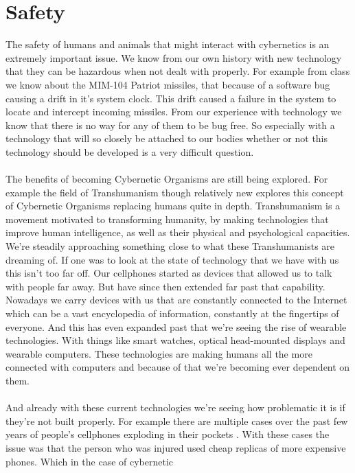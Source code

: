 \documentclass[12pt,a4paper,notitlepage]{article}
\begin{document}
\section{Safety}
The safety of humans and animals that might interact with cybernetics is an
extremely important issue. We know from our own history with new technology that
they can be hazardous when not dealt with properly. For example from class we
know about the MIM-104 Patriot missiles, that because of a software bug causing
a drift in it's system clock. This drift caused a failure in the system to
locate and intercept incoming missiles. From our experience with technology we
know that there is no way for any of them to be bug free. So especially with a
technology that will so closely be attached to our bodies whether or not this
technology should be developed is a very difficult question.
\\\\
The benefits of becoming Cybernetic Organisms are still being explored. For
example the field of Transhumanism\cite{Transhumanism} though relatively new
explores this concept of Cybernetic Organisms replacing humans quite in depth.
Transhumanism is a movement motivated to transforming humanity, by making
technologies that improve human intelligence, as well as their physical and
psychological capacities. We're steadily approaching something close to what
these Transhumanists are dreaming of. If one was to look at the state of
technology that we have with us this isn't too far off. Our cellphones started
as devices that allowed us to talk with people far away.  But have since then
extended far past that capability. Nowadays we carry devices with us that are
constantly connected to the Internet which can be a vast encyclopedia of
information, constantly at the fingertips of everyone.  And this has even
expanded past that we're seeing the rise of wearable technologies. With things
like smart watches, optical head-mounted displays and wearable computers. These
technologies are making humans all the more connected with computers and because
of that we're becoming ever dependent on them.
\\\\
And already with these current technologies we're seeing how problematic it is
if they're not built properly. For example there are multiple cases over the
past few years of people's cellphones exploding in their pockets \cite{exploding
cellphone}. With these cases the issue was that the person who was injured used
cheap replicas of more expensive phones. Which in the case of cybernetic
\end{document}

